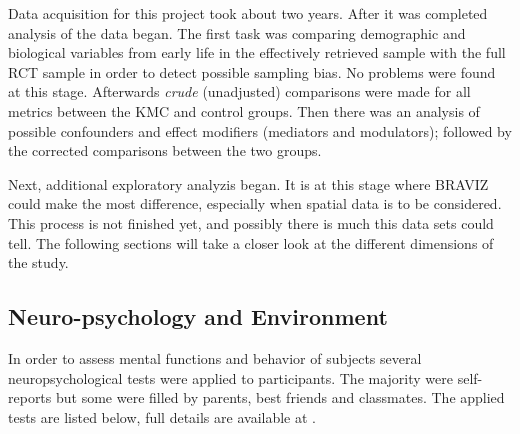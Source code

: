 Data acquisition for this project took about two years. After it was completed analysis of the data began. The first task was comparing demographic and biological variables from early life in the effectively retrieved sample with the full RCT sample in order to detect possible sampling bias. No problems were found at this stage. Afterwards \emph{crude} (unadjusted) comparisons were made for all metrics between the KMC and control groups. Then there was an analysis of possible confounders and effect modifiers (mediators and modulators); followed by the corrected comparisons between the two groups. 

Next, additional exploratory analyzis began. It is at this stage where BRAVIZ could make the most difference, especially when spatial data is to be considered. This process is not finished yet, and possibly there is much this data sets could tell. The following sections will take a closer look at the different dimensions of the study.

\subsection{Neuro-psychology and Environment}

In order to assess mental functions and behavior of subjects several neuropsychological tests were applied to participants. The majority were self-reports but some were filled by parents, best friends and classmates. The applied tests are listed below, full details are available at \autocite{uriza_reporte_2015}.

